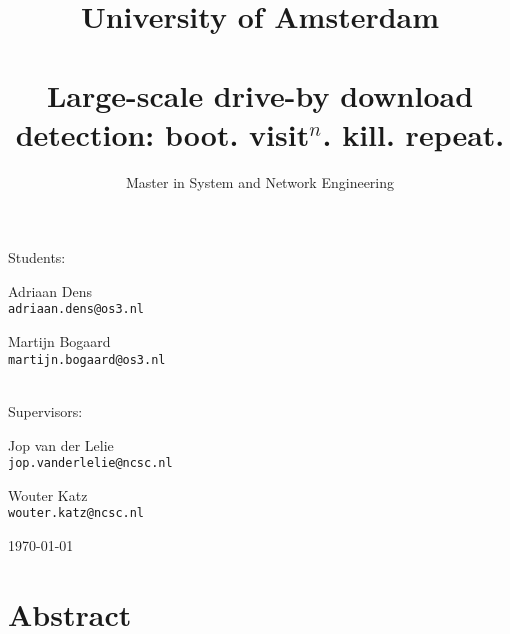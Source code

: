 \documentclass{scrartcl}
\title{University of Amsterdam \\[1cm] \horizontalrule{1pt}\\[0.5cm]Large-scale drive-by download detection: boot. visit$^n$. kill. repeat.}
\subtitle{Master in System and Network Engineering \\[0.5cm] \horizontalrule{1pt} }
\author{}
\date{}
\begin{document}

\maketitle

\vspace{-1cm}

\begin{center}

\Large
Students:\\[0.5cm]

\begin{minipage}{0.4\textwidth}
\begin{flushleft} \Large
Adriaan Dens\\\texttt{adriaan.dens@os3.nl}
\end{flushleft}
\end{minipage}%
\begin{minipage}{0.4\textwidth}
\begin{flushright} \Large
Martijn Bogaard\\\texttt{martijn.bogaard@os3.nl}
\end{flushright}
\end{minipage}\\[1.6cm]

\Large
Supervisors:\\[0.5cm]



\begin{minipage}{0.4\textwidth}
\begin{flushleft} \Large
Jop van der Lelie\\\texttt{jop.vanderlelie@ncsc.nl}
\end{flushleft}
\end{minipage}%
\begin{minipage}{0.4\textwidth}
\begin{flushright} \Large
Wouter Katz\\\texttt{wouter.katz@ncsc.nl}
\end{flushright}
\end{minipage}

\vfill

{\Large \today}
\end{center}

\clearpage

\section*{Abstract}
\end{document}
